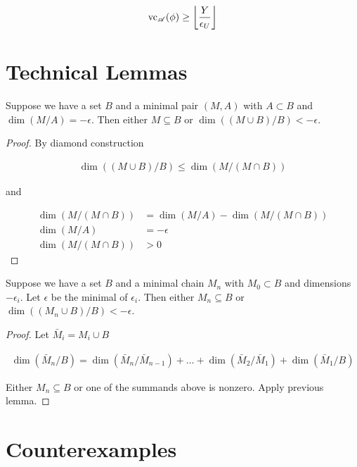 \documentclass{amsart}
\renewcommand{\AA}{\mathscr A}
\providecommand{\floor}[1]{\left \lfloor #1 \right \rfloor }
\begin{document}
\begin{align*}
	\vc_\AA(\phi) \geq \floor{\frac{Y}{\epsilon_U}}
\end{align*}

\section*{Technical Lemmas}

\begin{Lemma}
	Suppose we have a set $B$ and a minimal pair $(M, A)$ with $A \subset B$ and $\dim(M/A) = -\epsilon$.
Then either $M \subseteq B$ or $\dim((M \cup B)/B) < -\epsilon$.
\end{Lemma}

\begin{proof}
	By diamond construction

	\begin{align*}
		\dim((M \cup B)/B) \leq \dim(M / (M \cap B))
	\end{align*}

	and 

	\begin{align*}
		\dim(M / (M \cap B)) &= \dim (M/A) - \dim(M / (M \cap B)) \\
		\dim (M/A) &= -\epsilon \\
		\dim(M / (M \cap B)) &> 0
	\end{align*}
\end{proof}



\begin{Lemma}
	Suppose we have a set $B$ and a minimal chain $M_n$ with $M_0 \subset B$ and dimensions $-\epsilon_i$.
Let $\epsilon$ be the minimal of $\epsilon_i$.
Then either $M_n \subseteq B$ or $\dim((M_n \cup B)/B) < -\epsilon$.
\end{Lemma}


\begin{proof}
	Let $\bar M_i = M_i \cup B$

	\begin{align*}
		\dim(\bar M_n/B) = \dim(\bar M_n/\bar M_{n-1}) + \ldots + \dim(\bar M_2/\bar M_1) + \dim(\bar M_1/B)
	\end{align*}

	Either $M_n \subseteq B$ or one of the summands above is nonzero.
	Apply previous lemma.
\end{proof}

\section*{Counterexamples}


\end{document}
